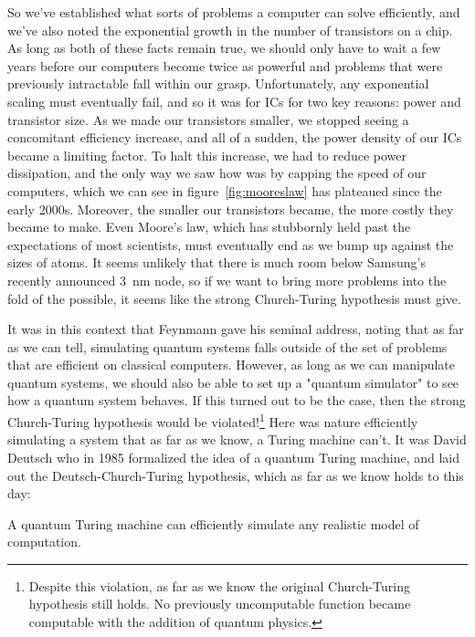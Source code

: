 So we've established what sorts of problems a computer can solve efficiently, and we've also noted the
exponential growth in the number of transistors on a chip. As long as both of these facts remain true, we
should only have to wait a few years before our computers become twice as powerful and problems that were
previously intractable fall within our grasp. Unfortunately, any exponential scaling must eventually fail,
and so it was for ICs for two key reasons: power and transistor size. As we made our transistors smaller,
we stopped seeing a concomitant efficiency increase, and all of a sudden, the power density of our ICs
became a limiting factor. To halt this increase, we had to reduce power dissipation, and the
only way we saw how was by capping the speed of our computers, which we can see in figure~\ref{fig:mooreslaw}
has plateaued since the early 2000s. Moreover, the smaller our transistors became, the more costly they became
to make. Even Moore's law, which has stubbornly held past the expectations of most scientists, must eventually
end as we bump up against the sizes of atoms. It seems unlikely that there is much room below Samsung's
recently announced \SI{3}{\nano\meter} node, so if we want to bring more problems into the fold of the
possible, it seems like the strong Church-Turing hypothesis must give.

It was in this context that Feynmann gave his seminal address, noting that as far as we can tell, simulating
quantum systems falls outside of the set of problems that are efficient on classical computers\cite{Feynman1982}.
However, as long as we can manipulate quantum systems, we should also be able to set up a "quantum
simulator" to see how a quantum system behaves. If this turned out to be the case, then the strong
Church-Turing hypothesis would be violated!\footnote{Despite this violation, as far as we know the original
Church-Turing hypothesis still holds. No previously uncomputable function became computable with the addition
of quantum physics.} Here was nature efficiently simulating a system that as far as we know, a Turing machine
can't. It was David Deutsch who in 1985 formalized the idea of a quantum Turing machine\cite{doi:10.1098/rspa.1985.0070},
and laid out the Deutsch-Church-Turing hypothesis, which as far as we know holds to this day:

\begin{displayquote}
  A quantum Turing machine can efficiently simulate any realistic model of computation.
\end{displayquote}


